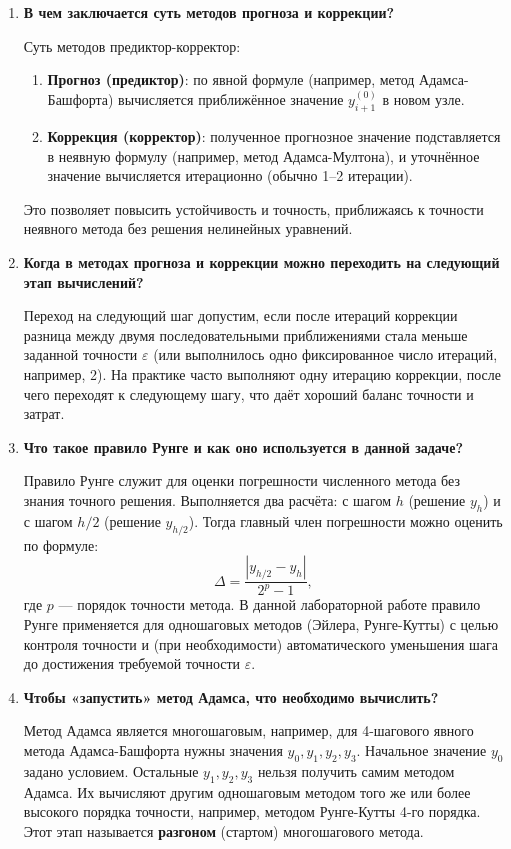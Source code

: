 \documentclass[a4paper,12pt]{article}
\begin{document}
\begin{enumerate}
\item \textbf{В чем заключается суть методов прогноза и коррекции?}

Суть методов предиктор-корректор:
\begin{enumerate}
    \item \textbf{Прогноз (предиктор)}: по явной формуле (например, метод Адамса-Башфорта) вычисляется приближённое значение \( y_{i+1}^{(0)} \) в новом узле.
    \item \textbf{Коррекция (корректор)}: полученное прогнозное значение подставляется в неявную формулу (например, метод Адамса-Мултона), и уточнённое значение вычисляется итерационно (обычно 1–2 итерации).
\end{enumerate}
Это позволяет повысить устойчивость и точность, приближаясь к точности неявного метода без решения нелинейных уравнений.

\item \textbf{Когда в методах прогноза и коррекции можно переходить на следующий этап вычислений?}

Переход на следующий шаг допустим, если после итераций коррекции разница между двумя последовательными приближениями стала меньше заданной точности \( \varepsilon \) (или выполнилось одно фиксированное число итераций, например, 2). На практике часто выполняют одну итерацию коррекции, после чего переходят к следующему шагу, что даёт хороший баланс точности и затрат.

\item \textbf{Что такое правило Рунге и как оно используется в данной задаче?}

Правило Рунге служит для оценки погрешности численного метода без знания точного решения. Выполняется два расчёта: с шагом \( h \) (решение \( y_h \)) и с шагом \( h/2 \) (решение \( y_{h/2} \)). Тогда главный член погрешности можно оценить по формуле:
\[
\Delta = \frac{|y_{h/2} - y_h|}{2^p - 1},
\]
где \( p \) — порядок точности метода. В данной лабораторной работе правило Рунге применяется для одношаговых методов (Эйлера, Рунге-Кутты) с целью контроля точности и (при необходимости) автоматического уменьшения шага до достижения требуемой точности \( \varepsilon \).

\item \textbf{Чтобы «запустить» метод Адамса, что необходимо вычислить?}

Метод Адамса является многошаговым, например, для 4-шагового явного метода Адамса-Башфорта нужны значения \( y_0, y_1, y_2, y_3 \). Начальное значение \( y_0 \) задано условием. Остальные \( y_1, y_2, y_3 \) нельзя получить самим методом Адамса. Их вычисляют другим одношаговым методом того же или более высокого порядка точности, например, методом Рунге-Кутты 4-го порядка. Этот этап называется \textbf{разгоном} (стартом) многошагового метода.

\end{enumerate}
\end{document}
